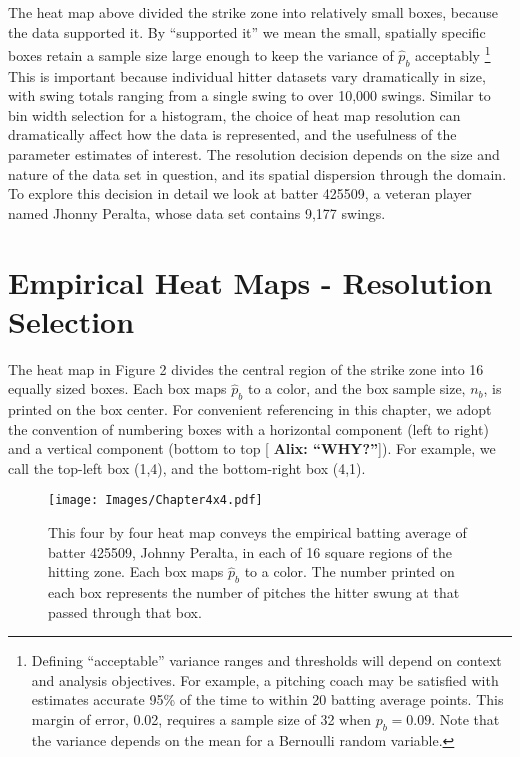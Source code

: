 \documentclass{article}
\begin{document}
The heat map above divided the strike zone into relatively small boxes, because the data supported it. By ``supported it'' we mean the small, spatially specific boxes retain a sample size large enough to keep the variance of $\hat{p}_{b}$ acceptably \footnote{Defining ``acceptable'' variance ranges and thresholds will depend on context and analysis objectives. For example, a pitching coach may be satisfied with estimates accurate 95\% of the time to within 20 batting average points. This margin of error, 0.02, requires a sample size of 32 when $p_{b} = 0.09$. Note that the variance depends on the mean for a Bernoulli random variable.} This is important because individual hitter datasets vary dramatically in size, with swing totals ranging from a single swing to over 10,000 swings. Similar to bin width selection for a histogram, the choice of heat map resolution can dramatically affect how the data is represented, and the usefulness of the parameter estimates of interest. The resolution decision depends on the size and nature of the data set in question, and its spatial dispersion through the domain. To explore this decision in detail we look at batter 425509, a veteran player named Jhonny Peralta, whose data set contains 9,177 swings.

\section{Empirical Heat Maps - Resolution Selection} %

The heat map in Figure 2 divides the central region of the strike zone into 16 equally sized boxes. Each box maps $\hat{p}_{b}$ to a color, and the box sample size, $n_{b}$, is printed on the box center. For convenient referencing in this chapter, we adopt the convention of numbering boxes with a horizontal component (left to right) and a vertical component (bottom to top [ {\bf Alix: ``WHY?''}]). For example, we call the top-left box (1,4), and the bottom-right box (4,1). 
        \begin{figure}[H]
      	\centering
      	\texttt{[image: Images/Chapter4x4.pdf]} 
      	\caption{This four by four heat map conveys the empirical batting average of batter 425509, Johnny Peralta, in each of 16 square regions of the hitting zone. Each box maps $\hat{p}_{b}$ to a color. The number printed on each box represents the number of pitches the hitter swung at that passed through that box.}
      	\end{figure} 
\end{document}
